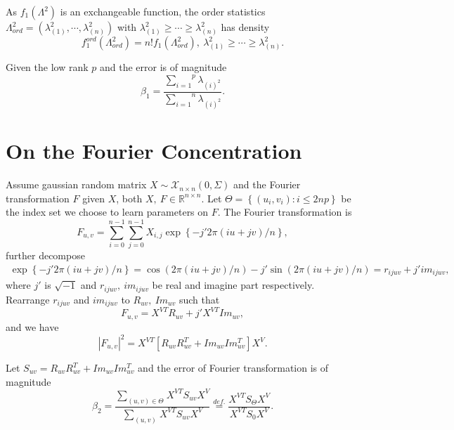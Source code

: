 \documentclass[12pt, a4paper, oneside]{article}
\begin{document}
    As $f_1(\Lambda^2)$ is an exchangeable function, the order statistics $\Lambda_{ord}^2=(\lambda_{(1)}^2,\cdots,\lambda_{(n)}^2)$ with $\lambda_{(1)}^2\geq\cdots\geq\lambda_{(n)}^2$ has density
    \begin{equation*}
        f_1^{ord}(\Lambda_{ord}^2)=n!f_1(\Lambda_{ord}^2),\ \lambda_{(1)}^2\geq\cdots\geq\lambda_{(n)}^2.
    \end{equation*}


    Given the low rank $p$ and the error is of magnitude
    \begin{equation*}
        \beta_1=\dfrac{\overset{p}{\underset{i=1}\sum}\lambda_{(i)^2}}{\overset{n}{\underset{i=1}\sum}\lambda_{(i)^2}}.
    \end{equation*}


\section{On the Fourier Concentration}
    Assume gaussian random matrix $X\sim\mathcal{X}_{n\times n}(0,\Sigma)$ and the Fourier transformation $F$ given $X$, both $X,\ F\in\mathbb{R}^{n\times n}$. Let $\Theta=\left\{ (u_i,v_i):i\leq 2np \right\}$ be the index set we choose to learn parameters on $F$. The Fourier transformation is
    \begin{equation*}
        F_{u,v}=\overset{n-1}{\underset{i=0}\sum}\overset{n-1}{\underset{j=0}\sum}X_{i,j}\exp\left\{ -j'2\pi(iu+jv)/n \right\},
    \end{equation*}
    further decompose
    \begin{align*}
        \exp\left\{ -j'2\pi(iu+jv)/n \right\}=\cos\left( 2\pi(iu+jv)/n \right)-j'\sin\left( 2\pi(iu+jv)/n \right)=r_{ijuv}+j'im_{ijuv},
    \end{align*}
    where $j'$ is $\sqrt{-1}$ and $r_{ijuv},\ im_{ijuv}$ be real and imagine part respectively. Rearrange $r_{ijuv}$ and $im_{ijuv}$ to $R_{uv},\ Im_{uv}$ such that
    \begin{equation*}
        F_{u,v}=X^{VT}R_{uv}+j'X^{VT}Im_{uv},
    \end{equation*}
    and we have
    \begin{equation*}
        |F_{u,v}|^2=X^{VT}\left[ R_{uv}R_{uv}^T+Im_{uv}Im_{uv}^T \right]X^V.
    \end{equation*}


    Let $S_{uv}=R_{uv}R_{uv}^T+Im_{uv}Im_{uv}^T$ and the error of Fourier transformation is of magnitude
    \begin{equation*}
        \beta_2=\dfrac{\overset{}{\underset{(u,v)\in\Theta}\sum}X^{VT}S_{uv}X^V}{\overset{}{\underset{(u,v)}\sum}X^{VT}S_{uv}X^V}\overset{def.}{=}\dfrac{X^{VT}S_{\Theta}X^V}{X^{VT}S_0X^V}.
    \end{equation*}
\newpage


\end{document}
